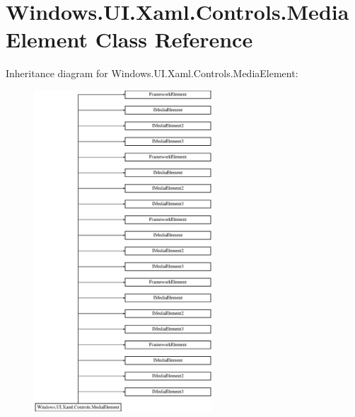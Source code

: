 \hypertarget{class_windows_1_1_u_i_1_1_xaml_1_1_controls_1_1_media_element}{}\section{Windows.\+U\+I.\+Xaml.\+Controls.\+Media\+Element Class Reference}
\label{class_windows_1_1_u_i_1_1_xaml_1_1_controls_1_1_media_element}
Inheritance diagram for Windows.\+U\+I.\+Xaml.\+Controls.\+Media\+Element\+:\begin{figure}[H]
\begin{center}
\leavevmode
\includegraphics[height=12.000000cm]{class_windows_1_1_u_i_1_1_xaml_1_1_controls_1_1_media_element}
\end{center}
\end{figure}
